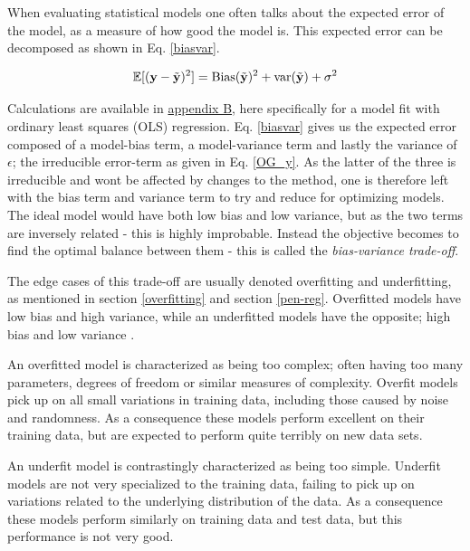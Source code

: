 When evaluating statistical models one often talks about the expected error of the model, as a measure of how good the model is. This expected error can be decomposed as shown in Eq. \ref{biasvar}. 

\begin{equation}\label{biasvar}
    \mathbb{E}[(\mathbf{y} - \Tilde{\mathbf{y}})^2] = \text{Bias}(\Tilde{\mathbf{y}})^2 + \text{var}(\Tilde{\mathbf{y}}) + \sigma^2
\end{equation}

Calculations are available in \hyperref[appendixB]{appendix B}, here specifically for a model fit with ordinary least squares (OLS) regression. 
Eq. \ref{biasvar} gives us the expected error composed of a model-bias term, a model-variance term and lastly the variance of $\epsilon$; the irreducible error-term as given in Eq. \ref{OG_y}. As the latter of the three is irreducible and wont be affected by changes to the method, one is therefore left with the bias term and variance term to try and reduce for optimizing models. 
The ideal model would have both low bias and low variance, but as the two terms are inversely related - this is highly improbable. Instead the objective becomes to find the optimal balance between them - this is called the \textit{bias-variance trade-off}. 

The edge cases of this trade-off are usually denoted overfitting and underfitting, as mentioned in section \ref{overfitting} and section \ref{pen-reg}. Overfitted models have low bias and high variance, while an underfitted models have the opposite; high bias and low variance \cite[Statistical interpretations and Resampling Methods]{morten}. 

An overfitted model is characterized as being too complex; often having too many parameters, degrees of freedom or similar measures of complexity. 
Overfit models pick up on all small variations in training data, including those caused by noise and randomness. As a consequence these models perform excellent on their training data, but are expected to perform quite terribly on new data sets. 

An underfit model is contrastingly characterized as being too simple. Underfit models are not very specialized to the training data, failing to pick up on variations related to the underlying distribution of the data. As a consequence these models perform similarly on training data and test data, but this performance is not very good. 